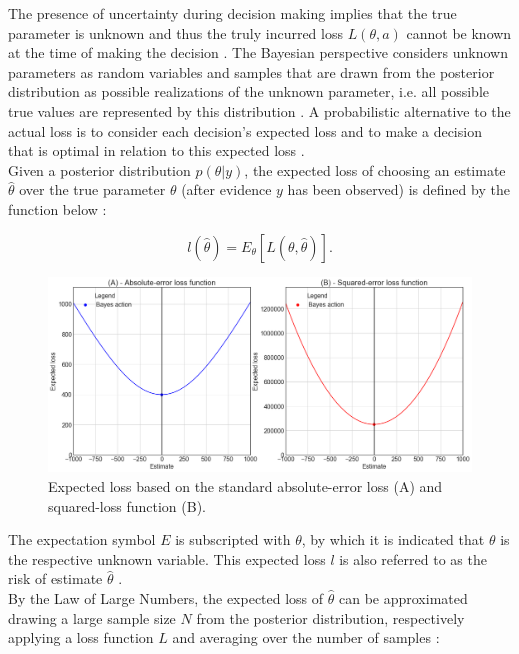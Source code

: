         The presence of uncertainty during decision making implies that the true parameter is unknown and thus the truly incurred loss $L(\theta,a)$ cannot be known at the time of making the decision \citep{berger2013stat, davidson2015}. The Bayesian perspective considers unknown parameters as random variables and samples that are drawn from the posterior distribution as possible realizations of the unknown parameter, i.e. all possible true values are represented by this distribution \citep{davidson2015}. A probabilistic alternative to the actual loss is to consider each decision's expected loss and to make a decision that is optimal in relation to this expected loss \citep{berger2013stat}. \\        
        Given a posterior distribution $p(\theta|y)$, the expected loss of choosing an estimate $\hat{\theta}$ over the true parameter $\theta$ (after evidence $y$ has been observed) is defined by the function below \citep{davidson2015}:
        
        \begin{equation}\label{eq:ExpectedLoss}
        l(\hat{\theta}) = E_{\theta}[L(\theta,\hat{\theta})].
        \end{equation}  
        
        \begin{figure}[h]
        	\centering
        	\includegraphics[width=1\textwidth]{Figures/loss_functions.png}
        	\caption{Expected loss based on the standard absolute-error loss (A) and squared-loss function (B).}\label{fig:standard_LF} 
        \end{figure}
        
        The expectation symbol $E$ is subscripted with $\theta$, by which it is indicated that $\theta$ is the respective unknown variable. This expected loss $l$ is also referred to as the risk of estimate $\hat{\theta}$ \citep{davidson2015}.\\        
        By the Law of Large Numbers, the expected loss of $\hat{\theta}$ can be approximated drawing a large sample size $N$ from the posterior distribution, respectively applying a loss function $L$ and averaging over the number of samples \citep{davidson2015}:
        
